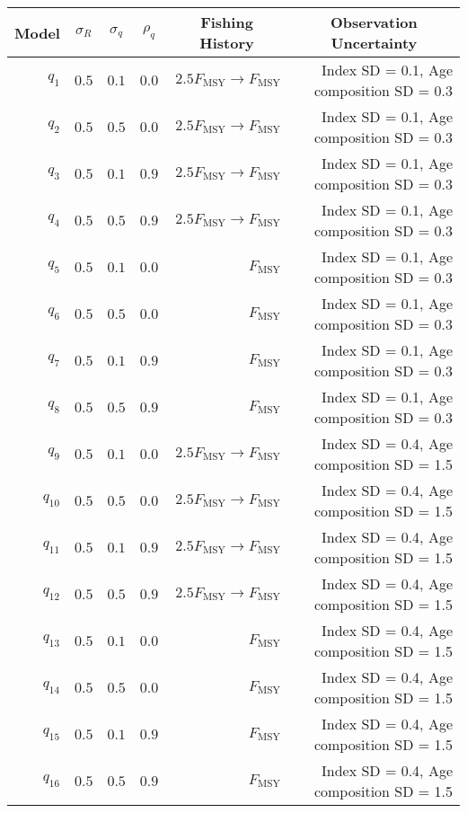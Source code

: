 \begin{center}
\begin{tabular}{rrrrrr}
\hline\hline
\multicolumn{1}{c}{Model}&\multicolumn{1}{c}{$\sigma_R$}&\multicolumn{1}{c}{$\sigma_{q}$}&\multicolumn{1}{c}{$\rho_{q}$}&\multicolumn{1}{c}{Fishing History}&\multicolumn{1}{c}{Observation Uncertainty}\tabularnewline
\hline
$q_{1}$&$0.5$&$0.1$&$0.0$&$2.5 F_{\text{MSY}} \rightarrow F_{\text{MSY}}$&Index SD = 0.1, Age composition SD = 0.3\tabularnewline
$q_{2}$&$0.5$&$0.5$&$0.0$&$2.5 F_{\text{MSY}} \rightarrow F_{\text{MSY}}$&Index SD = 0.1, Age composition SD = 0.3\tabularnewline
$q_{3}$&$0.5$&$0.1$&$0.9$&$2.5 F_{\text{MSY}} \rightarrow F_{\text{MSY}}$&Index SD = 0.1, Age composition SD = 0.3\tabularnewline
$q_{4}$&$0.5$&$0.5$&$0.9$&$2.5 F_{\text{MSY}} \rightarrow F_{\text{MSY}}$&Index SD = 0.1, Age composition SD = 0.3\tabularnewline
$q_{5}$&$0.5$&$0.1$&$0.0$&$F_{\text{MSY}}$&Index SD = 0.1, Age composition SD = 0.3\tabularnewline
$q_{6}$&$0.5$&$0.5$&$0.0$&$F_{\text{MSY}}$&Index SD = 0.1, Age composition SD = 0.3\tabularnewline
$q_{7}$&$0.5$&$0.1$&$0.9$&$F_{\text{MSY}}$&Index SD = 0.1, Age composition SD = 0.3\tabularnewline
$q_{8}$&$0.5$&$0.5$&$0.9$&$F_{\text{MSY}}$&Index SD = 0.1, Age composition SD = 0.3\tabularnewline
$q_{9}$&$0.5$&$0.1$&$0.0$&$2.5 F_{\text{MSY}} \rightarrow F_{\text{MSY}}$&Index SD = 0.4, Age composition SD = 1.5\tabularnewline
$q_{10}$&$0.5$&$0.5$&$0.0$&$2.5 F_{\text{MSY}} \rightarrow F_{\text{MSY}}$&Index SD = 0.4, Age composition SD = 1.5\tabularnewline
$q_{11}$&$0.5$&$0.1$&$0.9$&$2.5 F_{\text{MSY}} \rightarrow F_{\text{MSY}}$&Index SD = 0.4, Age composition SD = 1.5\tabularnewline
$q_{12}$&$0.5$&$0.5$&$0.9$&$2.5 F_{\text{MSY}} \rightarrow F_{\text{MSY}}$&Index SD = 0.4, Age composition SD = 1.5\tabularnewline
$q_{13}$&$0.5$&$0.1$&$0.0$&$F_{\text{MSY}}$&Index SD = 0.4, Age composition SD = 1.5\tabularnewline
$q_{14}$&$0.5$&$0.5$&$0.0$&$F_{\text{MSY}}$&Index SD = 0.4, Age composition SD = 1.5\tabularnewline
$q_{15}$&$0.5$&$0.1$&$0.9$&$F_{\text{MSY}}$&Index SD = 0.4, Age composition SD = 1.5\tabularnewline
$q_{16}$&$0.5$&$0.5$&$0.9$&$F_{\text{MSY}}$&Index SD = 0.4, Age composition SD = 1.5\tabularnewline
\hline
\end{tabular}\end{center}
